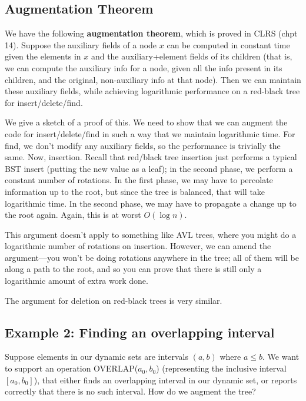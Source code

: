 \documentclass{article}
\begin{document}
\subsection{Augmentation Theorem}

We have the following \textbf{augmentation theorem}, which is proved
in CLRS (chpt 14).
Suppose the auxiliary fields of a node $x$ can be computed in constant time
given the elements in $x$ and the auxiliary+element fields of its children 
(that is, we can compute the auxiliary info for a node, given all the info
present in its children, and the original, non-auxiliary info at that node).
Then we can maintain these auxiliary fields, while achieving logarithmic
performance on a red-black tree for insert/delete/find.

We give a sketch of a proof of this.
We need to show that we can augment the code for insert/delete/find
in such a way that we maintain logarithmic time.
For find, we don't modify any auxiliary fields, so the performance is
trivially the same.
Now, insertion.
Recall that red/black tree insertion just performs a typical BST insert
(putting the new value as a leaf); in the second phase, we perform a
constant number of rotations.
In the first phase, we may have to percolate information up to the root,
but since the tree is balanced, that will take logarithmic time.
In the second phase, we may have to propagate a change up to the root again.
Again, this is at worst $O(\log n)$.

This argument doesn't apply to something like AVL trees, where you might do
a logarithmic number of rotations on insertion. However, we can amend 
the argument---you won't be doing rotations anywhere in the tree; all of them
will be along a path to the root, and so you can prove that there is still
only a logarithmic amount of extra work done.

The argument for deletion on red-black trees is very similar.




\subsection{Example 2: Finding an overlapping interval}

Suppose elements in our dynamic sets are intervals $(a,b)$ where $a\leq b$.
We want to support an operation OVERLAP($a_0, b_0$) (representing the
inclusive interval $[a_0,b_0]$), that either
finds an overlapping interval in our dynamic set, or reports correctly
that there is no such interval. How do we augment the tree?
\end{document}
